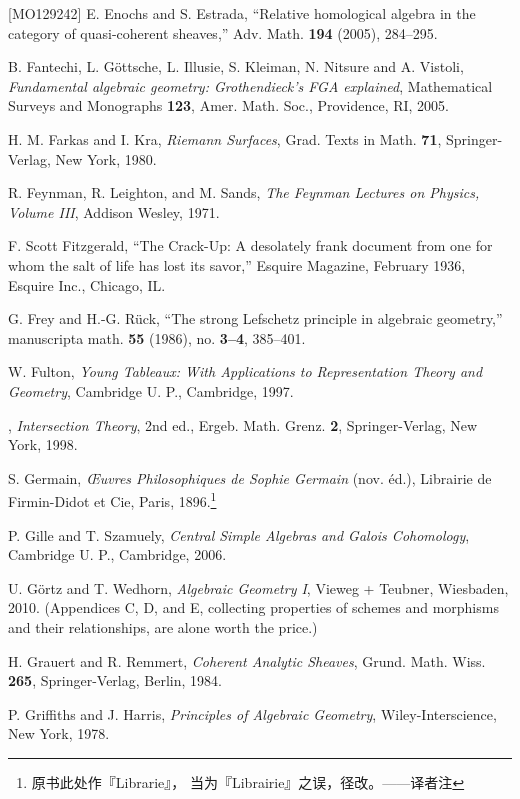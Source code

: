 \begin{thebibliography}{[MO129242]}
E. Enochs and S. Estrada, ``Relative homological algebra in the category of
quasi-coherent sheaves,'' Adv. Math. \textbf{194} (2005), 284--295.

B. Fantechi, L. Göttsche, L. Illusie, S. Kleiman, N. Nitsure and A. Vistoli,
\emph{Fundamental algebraic geometry: Grothendieck's FGA explained},
Mathematical Surveys and Monographs \textbf{123}, Amer. Math. Soc.,
Providence, RI, 2005.

H. M. Farkas and I. Kra, \emph{Riemann Surfaces}, Grad. Texts in Math.
\textbf{71}, Springer-Verlag, New York, 1980.

R. Feynman, R. Leighton, and M. Sands, \emph{The Feynman Lectures on Physics,
Volume III}, Addison Wesley, 1971.

F. Scott Fitzgerald, ``The Crack-Up: A desolately frank document from one for
whom the salt of life has lost its savor,'' Esquire Magazine, February 1936,
Esquire Inc., Chicago, IL.

G. Frey and H.-G. Rück, ``The strong Lefschetz principle in algebraic
geometry,'' manuscripta math. \textbf{55} (1986), no. \textbf{3--4},
385--401.

W. Fulton, \emph{Young Tableaux: With Applications to Representation Theory
and Geometry}, Cambridge U. P., Cambridge, 1997.

\sameauthor, \emph{Intersection Theory}, 2nd ed., Ergeb. Math. Grenz.
\textbf{2}, Springer-Verlag, New York, 1998.

S. Germain, \emph{Œuvres Philosophiques de Sophie Germain} (nov. éd.),
Librairie de Firmin-Didot et Cie, Paris, 1896.\footnote{原书此处作『Librarie』，
当为『Librairie』之误，径改。——译者注}

P. Gille and T. Szamuely, \emph{Central Simple Algebras and Galois
Cohomology}, Cambridge U. P., Cambridge, 2006.

U. Görtz and T. Wedhorn, \emph{Algebraic Geometry I}, Vieweg + Teubner,
Wiesbaden, 2010. (Appendices C, D, and E, collecting properties of schemes and
morphisms and their relationships, are alone worth the price.)

H. Grauert and R. Remmert, \emph{Coherent Analytic Sheaves}, Grund. Math.
Wiss. \textbf{265}, Springer-Verlag, Berlin, 1984.

P. Griffiths and J. Harris, \emph{Principles of Algebraic Geometry},
Wiley-Interscience, New York, 1978.


\end{thebibliography}
